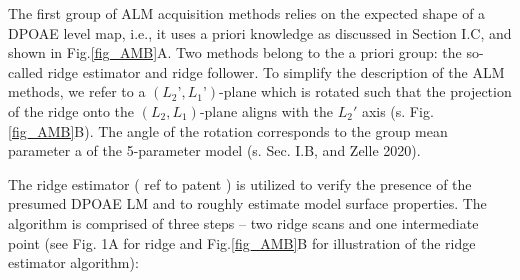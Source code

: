 \documentclass[journal,twoside,web]{ieeecolor2}
\begin{document}
The first group of ALM acquisition methods relies on the expected shape of a DPOAE level map, i.e., it uses a priori knowledge as discussed in Section I.C, and shown in Fig.\ref{fig_AMB}A. Two methods belong to the a priori group: the so-called ridge estimator and ridge follower. To simplify the description of the ALM methods, we refer to a $(L_2’, L_1’)$-plane which is rotated such that the projection of the ridge onto the $(L_2, L_1)$-plane aligns with the $L_2'$ axis (s. Fig.\ref{fig_AMB}B).  The angle of the rotation corresponds to the group mean parameter a of the 5-parameter model (s. Sec. I.B, and Zelle 2020).

The ridge estimator ( ref to patent ) is utilized to verify the presence of the presumed DPOAE LM and to roughly estimate model surface properties. The algorithm is comprised of three steps – two ridge scans and one intermediate point (see Fig. 1A for ridge and Fig.\ref{fig_AMB}B for illustration of the ridge estimator algorithm):
\end{document}
